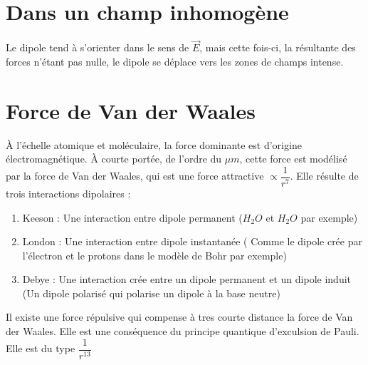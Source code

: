 \section{Dans un champ inhomogène}
\begin{prop}
Le dipole tend à s'orienter dans le sens de $\overrightarrow{E}$, mais cette fois-ci, la résultante des forces n'étant pas nulle, le dipole se déplace vers les zones de champs intense.
\end{prop}
\section{Force de Van der Waales}
\begin{de}
À l'échelle atomique et moléculaire, la force dominante est d'origine électromagnétique. À courte portée, de l'ordre du $\mu m$, cette force est modélisé par la force de Van der Waales, qui est une force attractive $\propto \dfrac{1}{r^7}$. Elle résulte de trois interactions dipolaires :
\begin{enumerate}[1-]
 \item Keeson : Une interaction entre dipole permanent ($H_2O$ et $H_2O$ par exemple)
 \item London : Une interaction entre dipole instantanée ( Comme le dipole crée par l'électron et le protons dans le modèle de Bohr par exemple)
 \item Debye : Une interaction crée entre un dipole permanent et un dipole induit (Un dipole polarisé qui polarise un dipole à la base neutre)
\end{enumerate}
Il existe une force répulsive qui compense à tres courte distance la force de Van der Waales. Elle est une conséquence du principe quantique d'exculsion de Pauli. Elle est du type $\dfrac{1}{r^{13}}$
\end{de}

